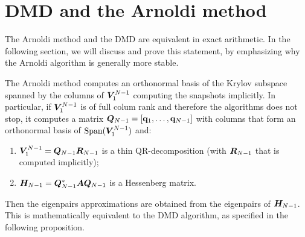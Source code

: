 \section{DMD and the Arnoldi method}
\label{section_dmd_arnoldi}
The Arnoldi method and the DMD are equivalent in exact arithmetic. In the following section, we will discuss and prove this statement, by emphasizing why the Arnoldi algorithm is generally more stable.

The Arnoldi method computes an orthonormal basis of the Krylov subspace spanned by the columns of $\vb*{V}_1^{N-1}$ computing the snapshots implicitly. In particular, if $\vb*{V}_1^{N-1}$ is of full colum rank and therefore the algorithms does not stop, it computes a matrix $\vb*{Q}_{N-1} = \left[\vb{q}_1,\dots, \vb{q}_{N-1}\right]$ with columns that form an orthonormal basis of $\mathrm{Span}{(\vb*{V}_1^{N-1})}$ and: 
\begin{enumerate}[label=(\roman*)]
    \item $\vb*{V}_1^{N-1} = \vb*{Q}_{N-1} \vb*{R}_{N-1}$ is a thin QR-decomposition (with $\vb*{R}_{N-1}$ that is computed implicitly);
    \item $\vb*{H}_{N-1} = \vb*{Q}_{N-1}^* \vb*{A} \vb*{Q}_{N-1}$ is a Hessenberg matrix.
\end{enumerate}
Then the eigenpairs approximations are obtained from the eigenpairs of $\vb*{H}_{N-1}$. This is mathematically equivalent to the DMD algorithm, as specified in the following proposition. 

